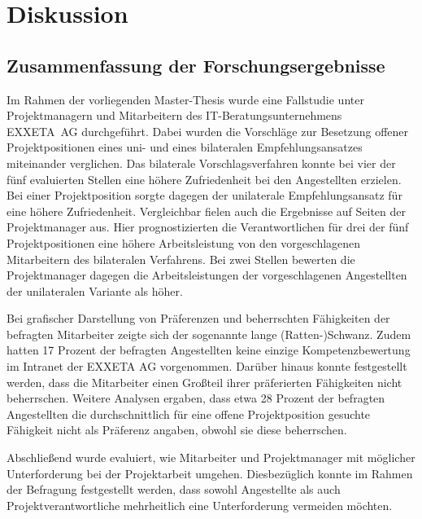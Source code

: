 \chapter{Diskussion}
\label{ch:diskussion}

\section{Zusammenfassung der Forschungsergebnisse}
\label{ch:diskussion:zusammenfassung}
Im Rahmen der vorliegenden Master-Thesis wurde eine Fallstudie unter Projektmanagern und Mitarbeitern des IT-Beratungsunternehmens \mbox{EXXETA AG} durchgeführt. Dabei wurden die Vorschläge zur Besetzung offener Projektpositionen eines uni- und eines bilateralen Empfehlungsansatzes miteinander verglichen. Das bilaterale Vorschlagsverfahren konnte bei vier der fünf evaluierten Stellen eine höhere Zufriedenheit bei den Angestellten erzielen. Bei einer Projektposition sorgte dagegen der unilaterale Empfehlungsansatz für eine höhere Zufriedenheit. Vergleichbar fielen auch die Ergebnisse auf Seiten der Projektmanager aus. Hier prognostizierten die Verantwortlichen für drei der fünf Projektpositionen eine höhere Arbeitsleistung von den vorgeschlagenen Mitarbeitern des bilateralen Verfahrens. Bei zwei Stellen bewerten die Projektmanager dagegen die Arbeitsleistungen der vorgeschlagenen Angestellten der unilateralen Variante als höher.

Bei grafischer Darstellung von Präferenzen und beherrschten Fähigkeiten der befragten Mitarbeiter zeigte sich der sogenannte lange (Ratten-)Schwanz. Zudem hatten 17 Prozent der befragten Angestellten keine einzige Kompetenzbewertung im Intranet der EXXETA AG vorgenommen. Darüber hinaus konnte festgestellt werden, dass die Mitarbeiter einen Großteil ihrer präferierten Fähigkeiten nicht beherrschen. Weitere Analysen ergaben, dass etwa 28 Prozent der befragten Angestellten die durchschnittlich für eine offene Projektposition gesuchte Fähigkeit nicht als Präferenz angaben, obwohl sie diese beherrschen. 

Abschließend wurde evaluiert, wie Mitarbeiter und Projektmanager mit möglicher Unterforderung bei der Projektarbeit umgehen. Diesbezüglich konnte im Rahmen der Befragung festgestellt werden, dass sowohl Angestellte als auch Projektverantwortliche mehrheitlich eine Unterforderung vermeiden möchten.
\newpage
